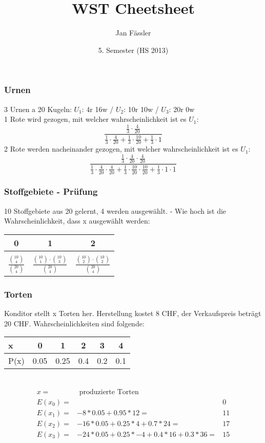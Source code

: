 \documentclass[landscape,twocolumn,a4paper]{article}
\title{
	\vspace{5cm}
	WST Cheetsheet
}
\author{ Jan Fässler}
\date{5. Semester (HS 2013)}
\begin{document}
\subsubsection*{Urnen}
3 Urnen a 20 Kugeln: $U_1$: 4r 16w / $U_2$: 10r 10w / $U_3$: 20r 0w \\
1 Rote wird gezogen, mit welcher wahrscheinlichkeit ist es $U_1$:
\begin{equation*}
\frac{\frac{1}{3} \cdot \frac{4}{20}}{\frac{1}{3} \cdot \frac{4}{20} + \frac{1}{3} \cdot \frac{10}{20} + \frac{1}{3} \cdot 1}
\end{equation*}	
2 Rote werden nacheinander gezogen, mit welcher wahrscheinlichkeit ist es $U_1$:
\begin{equation*}
\frac{\frac{1}{3} \cdot \frac{4}{20} \cdot \frac{4}{20}}{\frac{1}{3} \cdot \frac{4}{20} \cdot \frac{4}{20} + \frac{1}{3} \cdot \frac{10}{20} \cdot \frac{10}{20} + \frac{1}{3} \cdot 1 \cdot 1}
\end{equation*}		

\subsubsection*{Stoffgebiete - Prüfung}
10 Stoffgebiete aus 20 gelernt, 4 werden ausgewählt. - Wie hoch ist die Wahrscheinlichkeit, dass x ausgewählt werden:
\begin{tabular}{c | c | c} 
	0 & 1 & 2\\
	\hline 
	&& \\
	$\frac{\binom{10}{4}}{\binom{20}{4}}$ & $\frac{\binom{10}{1} \cdot \binom{10}{3}}{\binom{20}{4}}$ & $\frac{\binom{10}{2} \cdot \binom{10}{2}}{\binom{20}{4}}$
\end{tabular}

\subsubsection*{Torten}
Konditor stellt x Torten her. Herstellung kostet 8 CHF, der Verkaufspreis beträgt 20 CHF. Wahrscheinlichkeiten sind folgende:
\begin{tabular}{l | c c c c c}
	x & 0 & 1 & 2 & 3 & 4 \\
	\hline
	P(x) & 0.05 & 0.25 & 0.4 & 0.2 & 0.1
\end{tabular} \\
\begin{align*}
	x =& \text{ produzierte Torten} \\
	E(x_0) =&  &0 \\
	E(x_1) =& -8*0.05+0.95*12 =& 11 \\
	E(x_2) =& -16*0.05+0.25*4+0.7*24 =& 17 \\
	E(x_3) =& -24*0.05+0.25*-4+0.4*16+0.3*36 =& 15
\end{align*}
\end{document}
